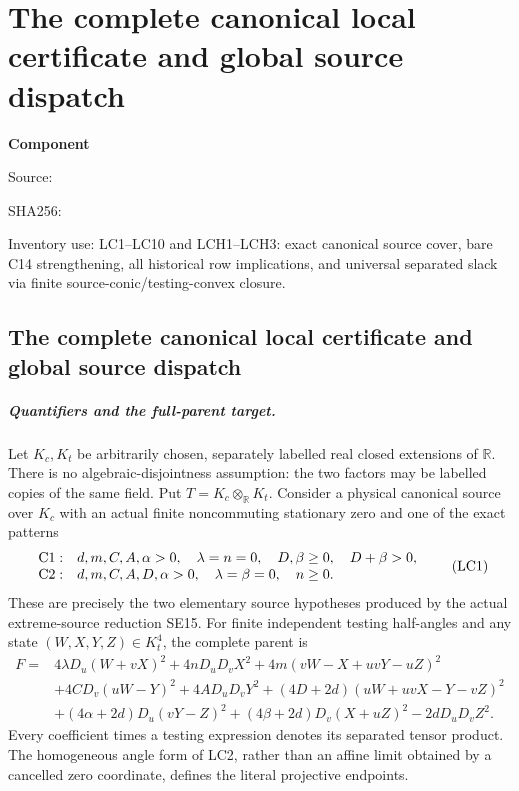 \chapter{The complete canonical local certificate and global source dispatch}
\label{component:pe1088004af65}
\noindent\textbf{Component }\par
{\small\noindent Source: \par}
{\small\noindent SHA256: \par}
{\small\noindent Inventory use: LC1--LC10 and LCH1--LCH3: exact canonical source cover, bare C14 strengthening, all historical row implications, and universal separated slack via finite source-conic/testing-convex closure.\par}
\medskip
\section{The complete canonical local certificate and global source dispatch}
\label{pe1088004af65:sec:complete-source-routing}

\paragraph{Quantifiers and the full-parent target.}
Let \(K_c,K_t\) be arbitrarily chosen, separately labelled real closed
extensions of \(\mathbb R\).  There is no algebraic-disjointness
assumption: the two factors may be labelled copies of the same field.
Put \(T=K_c\otimes_{\mathbb R}K_t\).
Consider a physical canonical source over \(K_c\) with an actual
finite noncommuting stationary zero and one of the exact patterns
\[
\begin{array}{ll}
{\rm C1}:&d,m,C,A,\alpha>0,\quad\lambda=n=0,\quad
             D,\beta\geq0,\quad D+\beta>0,\\
{\rm C2}:&d,m,C,A,D,\alpha>0,\quad\lambda=\beta=0,\quad n\geq0.
\end{array}\tag{LC1}
\]
These are precisely the two elementary source hypotheses produced
by the actual extreme-source reduction SE15.  For finite independent
testing half-angles and any state \((W,X,Y,Z)\in K_t^4\), the complete
parent is
\[
\begin{split}
 F={}&4\lambda D_u(W+vX)^2+4nD_uD_vX^2
       +4m(vW-X+uvY-uZ)^2\\
 &+4CD_v(uW-Y)^2+4AD_uD_vY^2
       +(4D+2d)(uW+uvX-Y-vZ)^2\\
 &+(4\alpha+2d)D_u(vY-Z)^2
       +(4\beta+2d)D_v(X+uZ)^2-2dD_uD_vZ^2 .
\end{split}\tag{LC2}
\]
Every coefficient times a testing expression denotes its separated
tensor product.  The homogeneous angle form of LC2, rather than
an affine limit obtained by a cancelled zero coordinate, defines
the literal projective endpoints.

